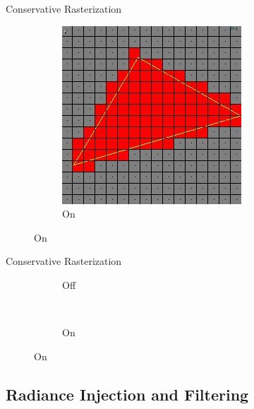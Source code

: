 \documentclass[10pt]{beamer}
\begin{document}
{\begin{frame}{Conservative Rasterization}
\begin{figure}
\begin{subfigure}[t]{0.475\textwidth}
      \includegraphics[width=\textwidth]{conservativeraster_on}
      \caption*{On}
    \end{subfigure}
  \end{figure}
\end{frame}}

\begin{frame}{Conservative Rasterization}

  \begin{figure}
    \begin{subfigure}[t]{0.475\textwidth}
      \caption*{Off}
    \end{subfigure}
    ~
    \begin{subfigure}[t]{0.475\textwidth}
      \caption*{On}
    \end{subfigure}
  \end{figure}
\end{frame}

\subsection{Radiance Injection and Filtering}
\end{document}
